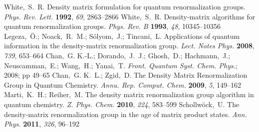 \documentclass[journal=jctcce]{achemso}
\begin{document}
\begin{mcitethebibliography}{79}
White,~S.~R. {Density matrix formulation for quantum renormalization groups}.
  \emph{Phys. Rev. Lett.} \textbf{1992}, \emph{69}, 2863--2866\relax
\mciteBstWouldAddEndPuncttrue
\mciteSetBstMidEndSepPunct{\mcitedefaultmidpunct}
{\mcitedefaultendpunct}{\mcitedefaultseppunct}\relax
\EndOfBibitem
{}
White,~S.~R. {Density-matrix algorithms for quantum renormalization groups}.
  \emph{Phys. Rev. B} \textbf{1993}, \emph{48}, 10345--10356\relax
\mciteBstWouldAddEndPuncttrue
\mciteSetBstMidEndSepPunct{\mcitedefaultmidpunct}
{\mcitedefaultendpunct}{\mcitedefaultseppunct}\relax
\EndOfBibitem
{}
Legeza,~{\"{O}}.; Noack,~R.~M.; S{\'{o}}lyom,~J.; Tincani,~L. {Applications of
  quantum information in the density-matrix renormalization group}. \emph{Lect.
  Notes Phys.} \textbf{2008}, \emph{739}, 653--664\relax
\mciteBstWouldAddEndPuncttrue
\mciteSetBstMidEndSepPunct{\mcitedefaultmidpunct}
{\mcitedefaultendpunct}{\mcitedefaultseppunct}\relax
\EndOfBibitem
{}
Chan,~G. K.-L.; Dorando,~J.~J.; Ghosh,~D.; Hachmann,~J.; Neuscamman,~E.;
  Wang,~H.; Yanai,~T. \emph{Front. Quantum Syst. Chem. Phys.}; 2008; pp
  49--65\relax
\mciteBstWouldAddEndPuncttrue
\mciteSetBstMidEndSepPunct{\mcitedefaultmidpunct}
{\mcitedefaultendpunct}{\mcitedefaultseppunct}\relax
\EndOfBibitem
{}
Chan,~G. K.~L.; Zgid,~D. {The Density Matrix Renormalization Group in Quantum
  Chemistry}. \emph{Annu. Rep. Comput. Chem.} \textbf{2009}, \emph{5},
  149--162\relax
\mciteBstWouldAddEndPuncttrue
\mciteSetBstMidEndSepPunct{\mcitedefaultmidpunct}
{\mcitedefaultendpunct}{\mcitedefaultseppunct}\relax
\EndOfBibitem
{}
Marti,~K.~H.; Reiher,~M. {The density matrix renormalization group algorithm in
  quantum chemistry}. \emph{Z. Phys. Chem.} \textbf{2010}, \emph{224},
  583--599\relax
\mciteBstWouldAddEndPuncttrue
\mciteSetBstMidEndSepPunct{\mcitedefaultmidpunct}
{\mcitedefaultendpunct}{\mcitedefaultseppunct}\relax
\EndOfBibitem
{}
Schollw{\"{o}}ck,~U. {The density-matrix renormalization group in the age of
  matrix product states}. \emph{Ann. Phys.} \textbf{2011}, \emph{326},
  96--192\relax
\mciteBstWouldAddEndPuncttrue
\mciteSetBstMidEndSepPunct{\mcitedefaultmidpunct}

\end{mcitethebibliography}
\end{document}
